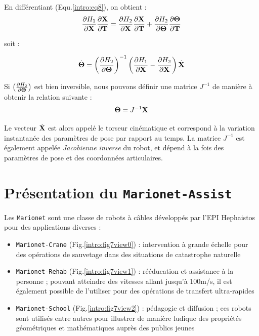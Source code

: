 En différentiant (Equ.\ref{intro:eq8}), on obtient :
\begin{equation}
\frac{\partial H_1}{\partial {\bf X}} \frac{\partial {\bf X}}{\partial {\bf T}} =  \frac{\partial H_2}{\partial {\bf X}} \frac{\partial {\bf X}}{\partial {\bf T}} + \frac{\partial H_2}{\partial {\bf \Theta}} \frac{\partial {\bf \Theta}}{\partial {\bf T}}
\label{intro:eq9}
\end{equation}

soit :

\begin{equation}
\dot {\bf \Theta} = \left ( \frac{\partial H_2}{\partial {\bf \Theta}} \right )^{-1} \left (\frac{\partial H_1}{\partial {\bf X}} - \frac{\partial H_2}{\partial {\bf X}} \right ) \dot {\bf X}
\label{intro:eq10}
\end{equation}

Si $\left ( \frac{\partial H_2}{\partial {\bf \Theta}} \right )$ est bien inversible, nous pouvons définir une matrice $J^{-1}$ de manière à obtenir la relation suivante :
\begin{equation}
\dot {\bf \Theta} = J^{-1} \dot {\bf X}
\label{intro:eq11}
\end{equation}

Le vecteur $\dot {\bf X}$ est alors appelé le torseur cinématique et correspond à la variation instantanée des paramètres de pose par rapport au temps. La matrice $J^{-1}$  est également appelée {\it Jacobienne inverse} du robot, et dépend à la fois des paramètres de pose et des coordonnées articulaires.


\section{Présentation du {\tt Marionet-Assist}}

Les {\tt Marionet} sont une classe de robots à câbles développés par l'EPI Hephaistos pour des applications diverses :
\begin{itemize}
 \item {\tt Marionet-Crane} (Fig.\ref{intro:fig7view0}) : intervention à grande échelle pour des opé\-rations de sauvetage dans des situations de catastrophe naturelle
 \item {\tt Marionet-Rehab} (Fig.\ref{intro:fig7view1}) : rééducation et assistance à la personne ; pouvant atteindre des vitesses allant jusqu'à 100m/s, il est également possible de l'utiliser pour des opérations de transfert ultra-rapides
 \item {\tt Marionet-School} (Fig.\ref{intro:fig7view2}) : pédagogie et diffusion ; ces robots sont utilisés entre autres pour illustrer de manière ludique des propriétés géométriques et mathématiques auprès des publics jeunes
\end{itemize}

